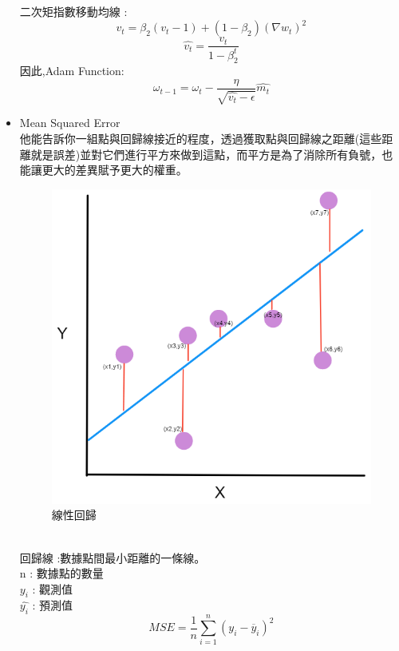 \documentclass[14pt,a4paper]{report}  %
\begin{document}
\begin{itemize}
二次矩指數移動均線 :\\
$$v_t=\beta_2(v_t-1)+(1-\beta_2)(\nabla{w_t})^2$$
$$\hat{v_t}=\frac{v_t}{1-\beta_2^t}$$
因此,Adam Function:\\
$$\omega_{t-1}=\omega_t-\frac{\eta}{\sqrt{\hat{v_t}-\epsilon}}\hat{m_t}$$
\item Mean Squared Error\\
他能告訴你一組點與回歸線接近的程度，透過獲取點與回歸線之距離(這些距離就是誤差)並對它們進行平方來做到這點，而平方是為了消除所有負號，也能讓更大的差異賦予更大的權重。\\
\vspace{8cm}
\begin{figure}
\begin{center}
\includegraphics[scale=0.6]{MSE}
\caption{\Large 線性回歸}\label{線性回歸}
\end{center}
\end{figure}
\\
回歸線 :數據點間最小距離的一條線。 \\
n : 數據點的數量\\
$y_i$ :  觀測值\\
$\hat{y_i}$ : 預測值\\
$$MSE=\frac{1}{n} \sum_{i=1}^n(y_i-\overline{y} _i)^2$$\\
\end{itemize}
\end{document}
